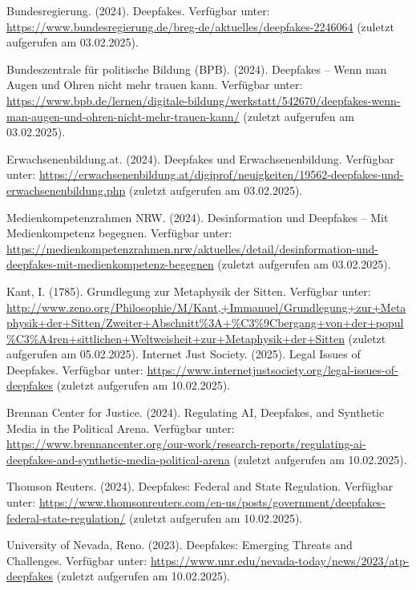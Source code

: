 \documentclass[a4paper,12pt]{article}
\begin{document}
\begin{thebibliography}{99}
     Bundesregierung. (2024). Deepfakes. 
    Verfügbar unter: \url{https://www.bundesregierung.de/breg-de/aktuelles/deepfakes-2246064} (zuletzt aufgerufen am 03.02.2025).
    
     Bundeszentrale für politische Bildung (BPB). (2024). Deepfakes – Wenn man Augen und Ohren nicht mehr trauen kann. 
    Verfügbar unter: \url{https://www.bpb.de/lernen/digitale-bildung/werkstatt/542670/deepfakes-wenn-man-augen-und-ohren-nicht-mehr-trauen-kann/} (zuletzt aufgerufen am 03.02.2025).
    
     Erwachsenenbildung.at. (2024). Deepfakes und Erwachsenenbildung. 
    Verfügbar unter: \url{https://erwachsenenbildung.at/digiprof/neuigkeiten/19562-deepfakes-und-erwachsenenbildung.php} (zuletzt aufgerufen am 03.02.2025).
    
     Medienkompetenzrahmen NRW. (2024). Desinformation und Deepfakes – Mit Medienkompetenz begegnen. 
    Verfügbar unter: \url{https://medienkompetenzrahmen.nrw/aktuelles/detail/desinformation-und-deepfakes-mit-medienkompetenz-begegnen} (zuletzt aufgerufen am 03.02.2025).
    
     Kant, I. (1785). Grundlegung zur Metaphysik der Sitten.  
    Verfügbar unter: \url{http://www.zeno.org/Philosophie/M/Kant,+Immanuel/Grundlegung+zur+Metaphysik+der+Sitten/Zweiter+Abschnitt%3A+%C3%9Cbergang+von+der+popul%C3%A4ren+sittlichen+Weltweisheit+zur+Metaphysik+der+Sitten} (zuletzt aufgerufen am 05.02.2025).  
     Internet Just Society. (2025). Legal Issues of Deepfakes.
    Verfügbar unter: \url{https://www.internetjustsociety.org/legal-issues-of-deepfakes} (zuletzt aufgerufen am 10.02.2025).

     Brennan Center for Justice. (2024). Regulating AI, Deepfakes, and Synthetic Media in the Political Arena.  
    Verfügbar unter: \url{https://www.brennancenter.org/our-work/research-reports/regulating-ai-deepfakes-and-synthetic-media-political-arena} (zuletzt aufgerufen am 10.02.2025).

     Thomson Reuters. (2024). Deepfakes: Federal and State Regulation.  
    Verfügbar unter: \url{https://www.thomsonreuters.com/en-us/posts/government/deepfakes-federal-state-regulation/} (zuletzt aufgerufen am 10.02.2025).

     University of Nevada, Reno. (2023). Deepfakes: Emerging Threats and Challenges.
    Verfügbar unter: \url{https://www.unr.edu/nevada-today/news/2023/atp-deepfakes} (zuletzt aufgerufen am 10.02.2025).

\end{thebibliography}
\newpage
\appendix
\end{document}

